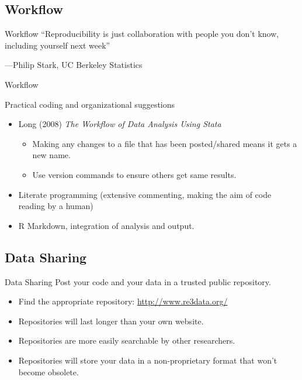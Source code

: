 \documentclass{beamer}
\begin{document}
 \subsection*{Workflow}
 \begin{frame}{Workflow}
``Reproducibility is just collaboration with people you don't know,
including yourself next week''

---Philip Stark, UC Berkeley Statistics
\end{frame}
\begin{frame}{Workflow}

 Practical coding and organizational suggestions
 \begin{itemize}
 \item Long (2008) \textit{The Workflow of Data Analysis Using Stata}
 \begin{itemize}
 	\item Making any changes to a file that has been posted/shared means it gets a new name.
 	\item Use version commands to ensure others get same results.
  \end{itemize}
 \item Literate programming (extensive commenting, making the aim of code reading by a human)
 \item R Markdown, integration of analysis and output.
\end{itemize}
\end{frame}

\subsection*{Data Sharing}
\begin{frame}{Data Sharing}
Post your code and your data in a trusted public repository.
\begin{itemize}[<.->]
\item
Find the appropriate repository: \url{http://www.re3data.org/}
\item
Repositories will last longer than your own website.
\item
Repositories are more easily searchable by other researchers.
\item
Repositories will store your data in a non-proprietary format that won't become obsolete.
\end{itemize}
\end{frame}
\end{document}
